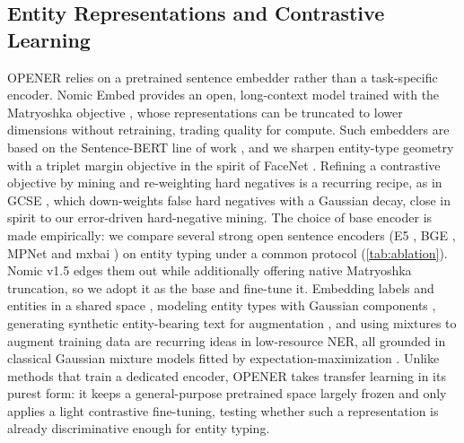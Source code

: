 \subsection{Entity Representations and Contrastive Learning}
\label{sec:related:repr}
OPENER relies on a pretrained sentence embedder rather than a task-specific encoder.
Nomic Embed \cite{nussbaum2024nomic} provides an open, long-context model trained with the Matryoshka objective \cite{kusupati2022matryoshka}, whose representations can be truncated to lower dimensions without retraining, trading quality for compute.
Such embedders are based on the Sentence-BERT line of work \cite{reimers2019sbert}, and we sharpen entity-type geometry with a triplet margin objective in the spirit of FaceNet \cite{schroff2015facenet}.
Refining a contrastive objective by mining and re-weighting hard negatives is a recurring recipe, as in GCSE \cite{lai2025gcse}, which down-weights false hard negatives with a Gaussian decay, close in spirit to our error-driven hard-negative mining.
The choice of base encoder is made empirically: we compare several strong open sentence encoders (E5 \cite{wang2022e5}, BGE \cite{xiao2024cpack}, MPNet \cite{song2020mpnet} and mxbai \cite{li2024aoe}) on entity typing under a common protocol (\autoref{tab:ablation}). Nomic v1.5 \cite{nussbaum2024nomic} edges them out while additionally offering native Matryoshka truncation, so we adopt it as the base and fine-tune it.
Embedding labels and entities in a shared space \cite{wang2018joint}, modeling entity types with Gaussian components \cite{zhang2025contrastivegaussian}, generating synthetic entity-bearing text for augmentation \cite{hu2023entity}, and using mixtures to augment training data \cite{abbahaddou2025gmmgnn} are recurring ideas in low-resource NER, all grounded in classical Gaussian mixture models fitted by expectation-maximization \cite{reynolds2009gmm, dempster1977em}.
Unlike methods that train a dedicated encoder, OPENER takes transfer learning in its purest form: it keeps a general-purpose pretrained space largely frozen and only applies a light contrastive fine-tuning, testing whether such a representation is already discriminative enough for entity typing.


